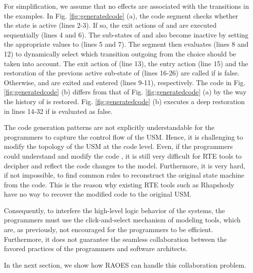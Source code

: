 For simplification, we assume that no effects are associated with the transitions in the examples.
In Fig. \ref{fig:generatedcode} (a), the code segment checks whether the state  is active (lines 2-3).
If so, the exit actions of  and  are executed sequentially (lines 4 and 6).
The sub-states of  and  also become inactive by setting the appropriate values to  (lines 5 and 7).
The segment then evaluates  (lines 8 and 12) to dynamically select which transition outgoing from the choice  should be taken into account.
The exit action of  (line 13), the entry action (line 15) and the restoration of the previous active sub-state of  (lines 16-26) are called if  is false. 
Otherwise,  and  are exited and entered (lines 9-11), respectively.
The code in Fig. \ref{fig:generatedcode} (b) differs from that of Fig. \ref{fig:generatedcode} (a) by the way the history of  is restored.
Fig. \ref{fig:generatedcode} (b) executes a deep restoration in lines 14-32 if  is evaluated as false.

The code generation patterns are not explicitly understandable for the programmers to capture the control flow of the USM. %
Hence, it is challenging to modify the topology of the USM at the code level. 
Even, if the programmers could understand and modify the code %
, it is still very difficult for RTE tools to decipher and reflect the code changes to the model.
Furthermore, 
it is very hard, if not impossible, to find common rules to reconstruct the original state machine from the code. 
This is the reason why existing RTE tools such as Rhapshody 
have no way to recover the modified code to the original USM.

Consequently, to interfere the high-level logic behavior of the systems, the programmers must use the click-and-select mechanism of modeling tools, which are, as previously, not encouraged for the programmers to be efficient. 
Furthermore, it does not guarantee the seamless collaboration between the favored practices of the programmers and software architects.  

In the next section, we show how RAOES can handle this collaboration problem.
